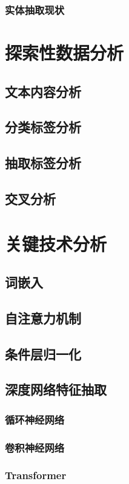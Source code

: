 \documentclass[letterpaper]{article}
\begin{document}
    \subsubsection{实体抽取现状}

\section{探索性数据分析}
  \subsection{文本内容分析}
  \subsection{分类标签分析}
  \subsection{抽取标签分析}
  \subsection{交叉分析}

\section{关键技术分析}
  \subsection{词嵌入}
  \subsection{自注意力机制}
  \subsection{条件层归一化}
  \subsection{深度网络特征抽取}
    \subsubsection{循环神经网络}
    \subsubsection{卷积神经网络}
    \subsubsection{Transformer}
\end{document}
